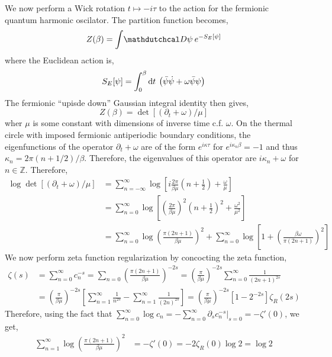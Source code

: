 \documentclass[12pt]{article}
\begin{document}
We now perform a Wick rotation $t \mapsto - i \tau$ to the action for the fermionic quantum harmonic oscilator. The partition function becomes,
\[ Z(\beta) = \int \pathd{\psi} e^{-S_E[\psi] } \]
where the Euclidean action is,
\[ S_E[\psi] = \int_0^\beta \mathrm{d}t \: \left( \bar{\psi} \dot{\psi} + \omega \bar{\psi} \psi \right) \] 
The fermionic ``upisde down'' Gaussian integral identity then gives,
\[ Z(\beta) = \det{\left[ \left( \partial_t + \omega \right) / \mu \right]} \]
wher $\mu$ is some constant with dimensions of inverse time c.f. $\omega$. On the thermal circle with imposed fermionic antiperiodic boundary conditions, the eigenfunctions of the operator $\partial_t + \omega$ are of the form $e^{i \kappa \tau}$ for $e^{i \kappa_n \beta} = -1$ and thus $\kappa_n = 2 \pi (n + 1/2) / \beta$. Therefore, the eigenvalues of this operator are $i \kappa_n + \omega$ for $n \in \mathbb{Z}$. Therefore,
\begin{align*}
\log{\det{\left[ \left( \partial_t + \omega \right) / \mu \right]}} & =  \sum_{n = -\infty}^\infty \log \left[ i \frac{2 \pi}{\beta \mu} \left(n + \frac{1}{2} \right) + \frac{\omega}{\mu} \right] 
\\
& = \sum_{n = 0}^\infty \log{\left[ \left( \frac{2 \pi}{\beta \mu} \right)^2 \left( n + \frac{1}{2} \right)^2 + \frac{\omega^2}{\mu^2} \right]}
\\
& =  \sum_{n = 0}^\infty \log{\left( \frac{\pi (2 n + 1)}{\beta \mu} \right)^2} + \sum_{n = 0}^\infty \log{\left[ 1 + \left( \frac{\beta \omega}{\pi (2 n + 1)} \right)^2 \right]}
\end{align*}
We now perform zeta function regularization by concocting the zeta function,
\begin{align*}
\zeta(s) &= \sum_{n = 0}^\infty c_n^{-s} = \sum_{n = 0} \left( \frac{ \pi (2 n + 1) }{\beta \mu} \right)^{-2s} = \left( \frac{\pi}{\beta \mu} \right)^{-2s} \sum^\infty_{n = 0} \frac{1}{(2 n + 1)^{2s}} 
\\
& = \left( \frac{\pi}{\beta \mu} \right)^{-2s} \left[ \sum^\infty_{n = 1} \frac{1}{n^{2s}} - \sum^\infty_{n = 1} \frac{1}{(2 n)^{2s}} \right] = \left( \frac{\pi}{\beta \mu} \right)^{-2s} \left[ 1 - 2^{-2s} \right] \zeta_R(2s)
\end{align*}
Therefore, using the fact that $\sum_{n = 0}^\infty \log{c_n} = - \sum_{n = 0}^\infty \partial_s c_{n}^{-s} |_{s = 0} = - \zeta'(0)$, we get,
\begin{align*}
\sum_{n = 1}^\infty \log{\left( \frac{\pi (2 n + 1)}{\beta \mu} \right)^2} & = - \zeta'(0) = -2 \zeta_R(0) \log{2} = \log{2}
\end{align*}
\end{document}
